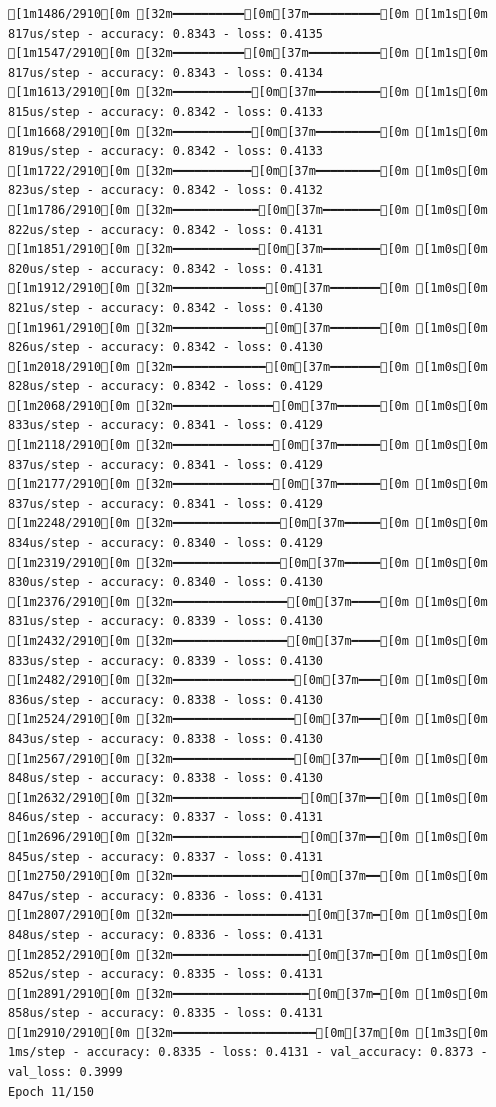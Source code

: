 \documentclass[
  letterpaper,
  DIV=11,
  numbers=noendperiod]{scrartcl}
\begin{document}
\begin{verbatim}
[1m1486/2910[0m [32m━━━━━━━━━━[0m[37m━━━━━━━━━━[0m [1m1s[0m 817us/step - accuracy: 0.8343 - loss: 0.4135
[1m1547/2910[0m [32m━━━━━━━━━━[0m[37m━━━━━━━━━━[0m [1m1s[0m 817us/step - accuracy: 0.8343 - loss: 0.4134
[1m1613/2910[0m [32m━━━━━━━━━━━[0m[37m━━━━━━━━━[0m [1m1s[0m 815us/step - accuracy: 0.8342 - loss: 0.4133
[1m1668/2910[0m [32m━━━━━━━━━━━[0m[37m━━━━━━━━━[0m [1m1s[0m 819us/step - accuracy: 0.8342 - loss: 0.4133
[1m1722/2910[0m [32m━━━━━━━━━━━[0m[37m━━━━━━━━━[0m [1m0s[0m 823us/step - accuracy: 0.8342 - loss: 0.4132
[1m1786/2910[0m [32m━━━━━━━━━━━━[0m[37m━━━━━━━━[0m [1m0s[0m 822us/step - accuracy: 0.8342 - loss: 0.4131
[1m1851/2910[0m [32m━━━━━━━━━━━━[0m[37m━━━━━━━━[0m [1m0s[0m 820us/step - accuracy: 0.8342 - loss: 0.4131
[1m1912/2910[0m [32m━━━━━━━━━━━━━[0m[37m━━━━━━━[0m [1m0s[0m 821us/step - accuracy: 0.8342 - loss: 0.4130
[1m1961/2910[0m [32m━━━━━━━━━━━━━[0m[37m━━━━━━━[0m [1m0s[0m 826us/step - accuracy: 0.8342 - loss: 0.4130
[1m2018/2910[0m [32m━━━━━━━━━━━━━[0m[37m━━━━━━━[0m [1m0s[0m 828us/step - accuracy: 0.8342 - loss: 0.4129
[1m2068/2910[0m [32m━━━━━━━━━━━━━━[0m[37m━━━━━━[0m [1m0s[0m 833us/step - accuracy: 0.8341 - loss: 0.4129
[1m2118/2910[0m [32m━━━━━━━━━━━━━━[0m[37m━━━━━━[0m [1m0s[0m 837us/step - accuracy: 0.8341 - loss: 0.4129
[1m2177/2910[0m [32m━━━━━━━━━━━━━━[0m[37m━━━━━━[0m [1m0s[0m 837us/step - accuracy: 0.8341 - loss: 0.4129
[1m2248/2910[0m [32m━━━━━━━━━━━━━━━[0m[37m━━━━━[0m [1m0s[0m 834us/step - accuracy: 0.8340 - loss: 0.4129
[1m2319/2910[0m [32m━━━━━━━━━━━━━━━[0m[37m━━━━━[0m [1m0s[0m 830us/step - accuracy: 0.8340 - loss: 0.4130
[1m2376/2910[0m [32m━━━━━━━━━━━━━━━━[0m[37m━━━━[0m [1m0s[0m 831us/step - accuracy: 0.8339 - loss: 0.4130
[1m2432/2910[0m [32m━━━━━━━━━━━━━━━━[0m[37m━━━━[0m [1m0s[0m 833us/step - accuracy: 0.8339 - loss: 0.4130
[1m2482/2910[0m [32m━━━━━━━━━━━━━━━━━[0m[37m━━━[0m [1m0s[0m 836us/step - accuracy: 0.8338 - loss: 0.4130
[1m2524/2910[0m [32m━━━━━━━━━━━━━━━━━[0m[37m━━━[0m [1m0s[0m 843us/step - accuracy: 0.8338 - loss: 0.4130
[1m2567/2910[0m [32m━━━━━━━━━━━━━━━━━[0m[37m━━━[0m [1m0s[0m 848us/step - accuracy: 0.8338 - loss: 0.4130
[1m2632/2910[0m [32m━━━━━━━━━━━━━━━━━━[0m[37m━━[0m [1m0s[0m 846us/step - accuracy: 0.8337 - loss: 0.4131
[1m2696/2910[0m [32m━━━━━━━━━━━━━━━━━━[0m[37m━━[0m [1m0s[0m 845us/step - accuracy: 0.8337 - loss: 0.4131
[1m2750/2910[0m [32m━━━━━━━━━━━━━━━━━━[0m[37m━━[0m [1m0s[0m 847us/step - accuracy: 0.8336 - loss: 0.4131
[1m2807/2910[0m [32m━━━━━━━━━━━━━━━━━━━[0m[37m━[0m [1m0s[0m 848us/step - accuracy: 0.8336 - loss: 0.4131
[1m2852/2910[0m [32m━━━━━━━━━━━━━━━━━━━[0m[37m━[0m [1m0s[0m 852us/step - accuracy: 0.8335 - loss: 0.4131
[1m2891/2910[0m [32m━━━━━━━━━━━━━━━━━━━[0m[37m━[0m [1m0s[0m 858us/step - accuracy: 0.8335 - loss: 0.4131
[1m2910/2910[0m [32m━━━━━━━━━━━━━━━━━━━━[0m[37m[0m [1m3s[0m 1ms/step - accuracy: 0.8335 - loss: 0.4131 - val_accuracy: 0.8373 - val_loss: 0.3999
Epoch 11/150


\end{verbatim}
\end{document}
